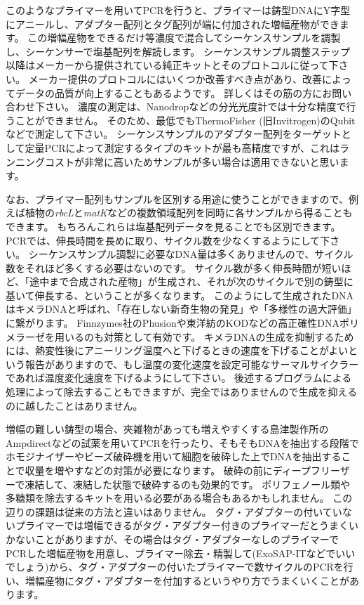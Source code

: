 \documentclass[titlepage,10pt,a4paper]{jsbook}
\begin{document}
このようなプライマーを用いてPCRを行うと、プライマーは鋳型DNAにY字型にアニールし、アダプター配列とタグ配列が端に付加された増幅産物ができます。
この増幅産物をできるだけ等濃度で混合してシーケンスサンプルを調製し、シーケンサーで塩基配列を解読します。
シーケンスサンプル調整ステップ以降はメーカーから提供されている純正キットとそのプロトコルに従って下さい。
メーカー提供のプロトコルにはいくつか改善すべき点があり、改善によってデータの品質が向上することもあるようです。
詳しくはその筋の方にお問い合わせ下さい。
濃度の測定は、Nanodropなどの分光光度計では十分な精度で行うことができません。
そのため、最低でもThermoFisher (旧Invitrogen)のQubitなどで測定して下さい。
シーケンスサンプルのアダプター配列をターゲットとして定量PCRによって測定するタイプのキットが最も高精度ですが、これはランニングコストが非常に高いためサンプルが多い場合は適用できないと思います。

なお、プライマー配列もサンプルを区別する用途に使うことができますので、例えば植物の\textit{rbcL}と\textit{matK}などの複数領域配列を同時に各サンプルから得ることもできます。
もちろんこれらは塩基配列データを見ることでも区別できます。
PCRでは、伸長時間を長めに取り、サイクル数を少なくするようにして下さい。
シーケンスサンプル調製に必要なDNA量は多くありませんので、サイクル数をそれほど多くする必要はないのです。
サイクル数が多く伸長時間が短いほど、「途中まで合成された産物」が生成され、それが次のサイクルで別の鋳型に基いて伸長する、ということが多くなります。
このようにして生成されたDNAはキメラDNAと呼ばれ、「存在しない新奇生物の発見」や「多様性の過大評価」に繋がります。
Finnzymes社のPhusionや東洋紡のKODなどの高正確性DNAポリメラーゼを用いるのも対策として有効です。
キメラDNAの生成を抑制するためには、熱変性後にアニーリング温度へと下げるときの速度を下げることがよいという報告があります\citep{Stevens2013}ので、もし温度の変化速度を設定可能なサーマルサイクラーであれば温度変化速度を下げるようにして下さい。
後述するプログラムによる処理によって除去することもできますが、完全ではありませんので生成を抑えるのに越したことはありません。

増幅の難しい鋳型の場合、夾雑物があっても増えやすくする島津製作所のAmpdirectなどの試薬を用いてPCRを行ったり、そもそもDNAを抽出する段階でホモジナイザーやビーズ破砕機を用いて細胞を破砕した上でDNAを抽出することで収量を増やすなどの対策が必要になります。
破砕の前にディープフリーザーで凍結して、凍結した状態で破砕するのも効果的です。
ポリフェノール類や多糖類を除去するキットを用いる必要がある場合もあるかもしれません。
この辺りの課題は従来の方法と違いはありません。
タグ・アダプターの付いていないプライマーでは増幅できるがタグ・アダプター付きのプライマーだとうまくいかないことがありますが、その場合はタグ・アダプターなしのプライマーでPCRした増幅産物を用意し、プライマー除去・精製して(ExoSAP-ITなどでいいでしょう)から、タグ・アダプターの付いたプライマーで数サイクルのPCRを行い、増幅産物にタグ・アダプターを付加するというやり方でうまくいくことがあります。
\end{document}
